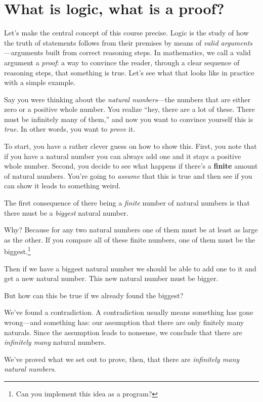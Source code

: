 \documentclass[11pt]{article}
\begin{document}
\section{What is logic, what is a proof?}
Let's make the central concept of this course precise. Logic is the study of how the truth of statements follows from their premises by means of \emph{valid arguments}---arguments built from correct reasoning steps. In mathematics, we call a valid argument a \emph{proof}: a way to convince the reader, through a clear sequence of reasoning steps, that something is true. Let's see what that looks like in practice with a simple example.

Say you were thinking about the \emph{natural numbers}---the numbers that are either zero or a positive whole number. You realize ``hey, there are a lot of these. There must be infinitely many of them,'' and now you want to convince yourself this is \emph{true}. In other words, you want to \emph{prove} it.

To start, you have a rather clever guess on how to show this. First, you note that if you have a natural number you can always add one and it stays a positive whole number. Second, you decide to see what happens if there's a \textbf{finite} amount of natural numbers. You're going to \emph{assume} that this is true and then see if you can show it leads to something weird.

The first consequence of there being a \emph{finite} number of natural numbers is that there must be a \emph{biggest} natural number.

Why? Because for any two natural numbers one of them must be at least as large as the other. If you compare all of these finite numbers, one of them must be the biggest.\footnote{Can you implement this idea as a program?}

Then if we have a biggest natural number we should be able to add one to it and get a new natural number. This new natural number must be bigger.

But how can this be true if we already found the biggest?

We've found a contradiction. A contradiction usually means something has gone wrong---and something has: our assumption that there are only finitely many naturals. Since the assumption leads to nonsense, we conclude that there are \emph{infinitely many} natural numbers.

We've proved what we set out to prove, then, that there are \emph{infinitely many natural numbers}.
\end{document}
